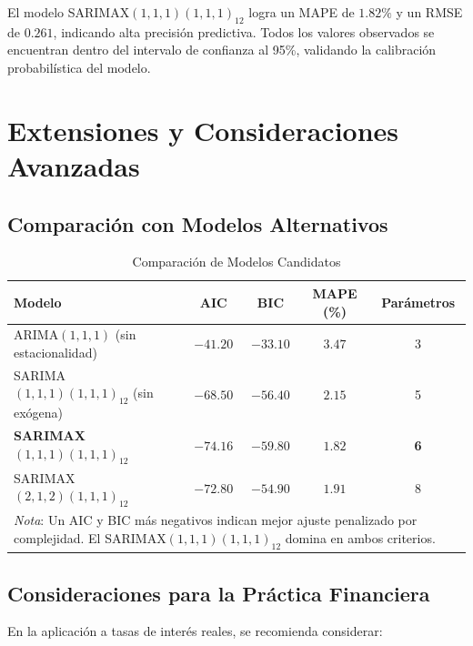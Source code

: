 \documentclass[12pt, letterpaper]{article}
\begin{document}
\begin{resultado}
El modelo SARIMAX$(1,1,1)(1,1,1)_{12}$ logra un MAPE de $1.82\%$ y un RMSE de $0.261$, indicando alta precisión predictiva. Todos los valores observados se encuentran dentro del intervalo de confianza al 95\%, validando la calibración probabilística del modelo.
\end{resultado}

\section{Extensiones y Consideraciones Avanzadas}

\subsection{Comparación con Modelos Alternativos}

\begin{table}[H]
\centering
\caption{Comparación de Modelos Candidatos}
\label{tab:comparacion}
\begin{tabular}{lcccc}
\toprule
\textbf{Modelo} & \textbf{AIC} & \textbf{BIC} & \textbf{MAPE (\%)} & \textbf{Parámetros} \\
\midrule
ARIMA$(1,1,1)$ (sin estacionalidad) & $-41.20$ & $-33.10$ & $3.47$ & 3 \\
SARIMA$(1,1,1)(1,1,1)_{12}$ (sin exógena) & $-68.50$ & $-56.40$ & $2.15$ & 5 \\
\textbf{SARIMAX$(1,1,1)(1,1,1)_{12}$} & $\mathbf{-74.16}$ & $\mathbf{-59.80}$ & $\mathbf{1.82}$ & \textbf{6} \\
SARIMAX$(2,1,2)(1,1,1)_{12}$ & $-72.80$ & $-54.90$ & $1.91$ & 8 \\
\bottomrule
\multicolumn{5}{p{13cm}}{\small \textit{Nota}: Un AIC y BIC más negativos indican mejor ajuste penalizado por complejidad. El SARIMAX$(1,1,1)(1,1,1)_{12}$ domina en ambos criterios.}
\end{tabular}
\end{table}

\subsection{Consideraciones para la Práctica Financiera}

En la aplicación a tasas de interés reales, se recomienda considerar:
\end{document}
